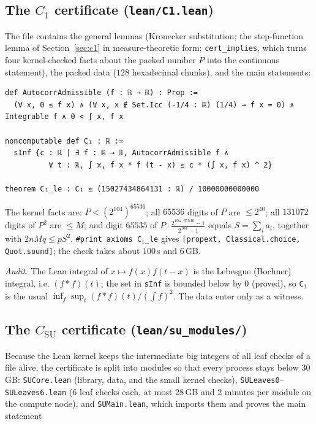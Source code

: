 \documentclass[11pt]{article}
\numberwithin{equation}{section}
\theoremstyle{definition}
\theoremstyle{remark}
\begin{document}
\subsection{The $C_1$ certificate (\texttt{lean/C1.lean})}\label{sec:lean-c1}
The file contains the general lemmas (Kronecker substitution; the step-function lemma of
Section~\ref{sec:c1} in measure-theoretic form; \texttt{cert\_implies}, which turns four kernel-checked
facts about the packed number $P$ into the continuous statement), the packed data ($128$ hexadecimal
chunks), and the main statements:
\begin{lstlisting}
def AutocorrAdmissible (f : ℝ → ℝ) : Prop :=
  (∀ x, 0 ≤ f x) ∧ (∀ x, x ∉ Set.Icc (-1/4 : ℝ) (1/4) → f x = 0) ∧ Integrable f ∧ 0 < ∫ x, f x

noncomputable def C₁ : ℝ :=
  sInf {c : ℝ | ∃ f : ℝ → ℝ, AutocorrAdmissible f ∧
          ∀ t : ℝ, ∫ x, f x * f (t - x) ≤ c * (∫ x, f x) ^ 2}

theorem C₁_le : C₁ ≤ (15027434864131 : ℝ) / 10000000000000
\end{lstlisting}
The kernel facts are: $P<(2^{104})^{65536}$; all $65536$ digits of $P$ are $\le 2^{40}$; all
$131072$ digits of $P^2$ are $\le M$; and digit $65535$ of $P\cdot\frac{2^{104\cdot65536}-1}{2^{104}-1}$
equals $S=\sum_i a_i$, together with $2nMq\le pS^2$. \texttt{\#print axioms C}$_1$\texttt{\_le} gives
\texttt{[propext, Classical.choice, Quot.sound]}; the check takes about $100$\,s and $6$\,GB.

\emph{Audit.} The Lean integral of $x\mapsto f(x)f(t-x)$ is the Lebesgue (Bochner) integral, i.e. $(f*f)(t)$; the set
in \texttt{sInf} is bounded below by $0$ (proved), so \texttt{C}$_1$ is the usual
$\inf_f\sup_t (f*f)(t)/(\int f)^2$. The data enter only as a witness.

\subsection{The $C_{\mathrm{SU}}$ certificate (\texttt{lean/su\_modules/})}\label{sec:lean-su}
Because the Lean kernel keeps the intermediate big integers of all leaf checks of a file alive, the
certificate is split into modules so that every process stays below $30$\,GB: \texttt{SUCore.lean}
(library, data, and the small kernel checks), \texttt{SULeaves0}--\texttt{SULeaves6.lean} ($6$ leaf checks
each, at most $28$\,GB and $2$ minutes per module on the compute node), and \texttt{SUMain.lean}, which
imports them and proves the main statement
\end{document}
